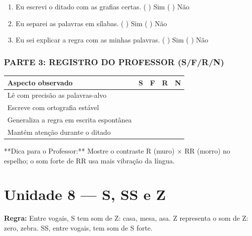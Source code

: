 \begin{exercicio}
\begin{enumerate}[label=\alph*)]
  \item Eu escrevi o ditado com as grafias certas.  \quad ( ) Sim   ( ) Não

  \item Eu separei as palavras em sílabas.  \quad ( ) Sim   ( ) Não

  \item Eu sei explicar a regra com as minhas palavras.  \quad ( ) Sim   ( ) Não

\end{enumerate}

\subsection*{PARTE 3: REGISTRO DO PROFESSOR (S/F/R/N)}

\begin{center}
\renewcommand{\arraystretch}{1.4}
\begin{tabular}{@{}p{9cm}cccc@{}}
\toprule
Aspecto observado & S & F & R & N \\
\midrule
Lê com precisão as palavras-alvo & & & & \\
Escreve com ortografia estável & & & & \\
Generaliza a regra em escrita espontânea & & & & \\
Mantém atenção durante o ditado & & & & \\
\bottomrule\end{tabular}\end{center}

\end{exercicio}

\begin{dica}
**Dica para o Professor:** Mostre o contraste R (muro) × RR (morro) no espelho; o som forte de RR usa mais vibração da língua.
\end{dica}



\chapter{Unidade 8 --- S, SS e Z}


\textbf{Regra:} Entre vogais, S tem som de Z: casa, mesa, asa. Z representa o som de Z: zero, zebra. SS, entre vogais, tem som de S forte.

